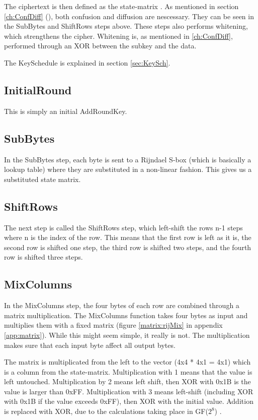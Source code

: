 The ciphertext is then defined as the state-matrix \citep[p. 103]{Stinson:2006}. 
As mentioned in section \ref{ch:ConfDiff} (), both 
confusion and diffusion are nescessary. They can be seen in the SubBytes and 
ShiftRows steps above. These steps also performs whitening, which strengthens the cipher. Whitening is, as mentioned in \ref{ch:ConfDiff}, performed through an 
XOR between the subkey and the data.

The KeySchedule is explained in section \ref{sec:KeySch}.

\subsection{InitialRound}
This is simply an initial AddRoundKey.

\subsection{SubBytes}
In the SubBytes step, each byte is sent to a Rijndael S-box (which is basically
 a lookup table) where they are substituted in a non-linear fashion. This gives 
us a substituted state matrix.

\subsection{ShiftRows}
The next step is called the ShiftRows step, which left-shift the rows n-1 
steps where n is the index of the row. This means that the first row is left 
as it is, the second row is shifted one step, the third row is shifted two 
steps, and the fourth row is shifted three steps.

\subsection{MixColumns}
In the MixColumns step, the four bytes of each row are combined through a matrix 
multiplication. The MixColumns function takes four bytes as input and multiplies 
them with a fixed matrix (figure \ref{matrix:rijMix} in appendix 
\ref{app:matrix}). While this might seem simple, it really is not. The 
multiplication makes sure that each input byte affect all output bytes.
\citep{Angelfire}

The matrix is multiplicated from the left to the vector (4x4 * 4x1 = 4x1) which 
is a column from the state-matrix. Multiplication with 1 means that the value 
is left untouched. Multiplication by 2 means left shift, then XOR with 0x1B is 
the value is larger than 0xFF. Multiplication with 3 means left-shift (including 
XOR with 0x1B if the value exceeds 0xFF), then XOR with the initial value. 
Addition is replaced with XOR, due to the calculations taking place in 
GF(\(2^8\)) .

